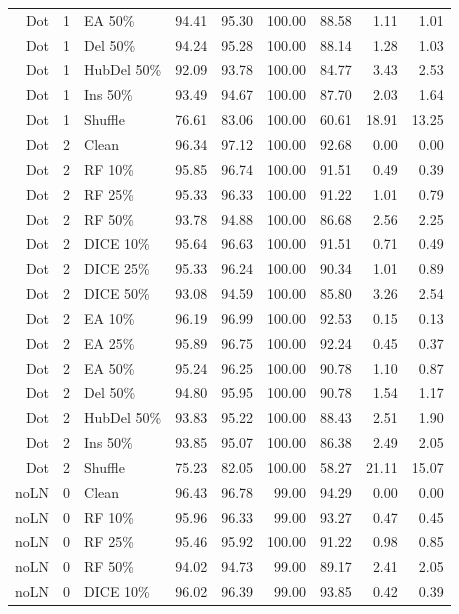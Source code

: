 {\begin{longtable}{rllrrrrrr}
Dot & 1 & EA 50\% & 94.41 & 95.30 & 100.00 & 88.58 & 1.11 & 1.01 \\
Dot & 1 & Del 50\% & 94.24 & 95.28 & 100.00 & 88.14 & 1.28 & 1.03 \\
Dot & 1 & HubDel 50\% & 92.09 & 93.78 & 100.00 & 84.77 & 3.43 & 2.53 \\
Dot & 1 & Ins 50\% & 93.49 & 94.67 & 100.00 & 87.70 & 2.03 & 1.64 \\
Dot & 1 & Shuffle & 76.61 & 83.06 & 100.00 & 60.61 & 18.91 & 13.25 \\
Dot & 2 & Clean & 96.34 & 97.12 & 100.00 & 92.68 & 0.00 & 0.00 \\
Dot & 2 & RF 10\% & 95.85 & 96.74 & 100.00 & 91.51 & 0.49 & 0.39 \\
Dot & 2 & RF 25\% & 95.33 & 96.33 & 100.00 & 91.22 & 1.01 & 0.79 \\
Dot & 2 & RF 50\% & 93.78 & 94.88 & 100.00 & 86.68 & 2.56 & 2.25 \\
Dot & 2 & DICE 10\% & 95.64 & 96.63 & 100.00 & 91.51 & 0.71 & 0.49 \\
Dot & 2 & DICE 25\% & 95.33 & 96.24 & 100.00 & 90.34 & 1.01 & 0.89 \\
Dot & 2 & DICE 50\% & 93.08 & 94.59 & 100.00 & 85.80 & 3.26 & 2.54 \\
Dot & 2 & EA 10\% & 96.19 & 96.99 & 100.00 & 92.53 & 0.15 & 0.13 \\
Dot & 2 & EA 25\% & 95.89 & 96.75 & 100.00 & 92.24 & 0.45 & 0.37 \\
Dot & 2 & EA 50\% & 95.24 & 96.25 & 100.00 & 90.78 & 1.10 & 0.87 \\
Dot & 2 & Del 50\% & 94.80 & 95.95 & 100.00 & 90.78 & 1.54 & 1.17 \\
Dot & 2 & HubDel 50\% & 93.83 & 95.22 & 100.00 & 88.43 & 2.51 & 1.90 \\
Dot & 2 & Ins 50\% & 93.85 & 95.07 & 100.00 & 86.38 & 2.49 & 2.05 \\
Dot & 2 & Shuffle & 75.23 & 82.05 & 100.00 & 58.27 & 21.11 & 15.07 \\
noLN & 0 & Clean & 96.43 & 96.78 & 99.00 & 94.29 & 0.00 & 0.00 \\
noLN & 0 & RF 10\% & 95.96 & 96.33 & 99.00 & 93.27 & 0.47 & 0.45 \\
noLN & 0 & RF 25\% & 95.46 & 95.92 & 100.00 & 91.22 & 0.98 & 0.85 \\
noLN & 0 & RF 50\% & 94.02 & 94.73 & 99.00 & 89.17 & 2.41 & 2.05 \\
noLN & 0 & DICE 10\% & 96.02 & 96.39 & 99.00 & 93.85 & 0.42 & 0.39 \\

\end{longtable}}
